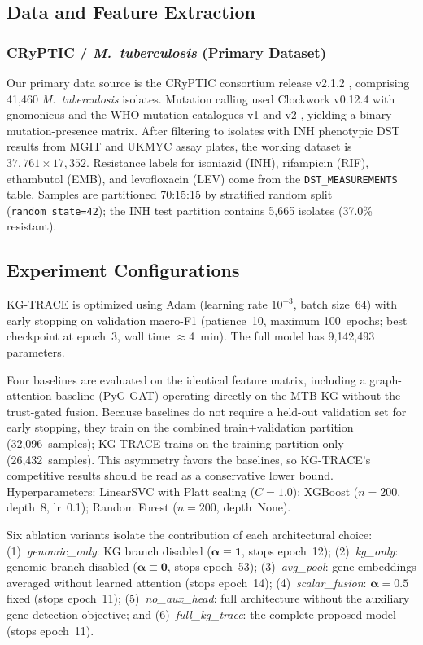 \documentclass[conference]{IEEEtran}
\begin{document}
\subsection{Data and Feature Extraction}

\subsubsection{CRyPTIC / \textit{M.~tuberculosis} (Primary Dataset)}

Our primary data source is the CRyPTIC consortium release v2.1.2 \cite{cryptic2022}, comprising 41,460 \textit{M.~tuberculosis} isolates. Mutation calling used Clockwork v0.12.4 with gnomonicus and the WHO mutation catalogues v1 and v2 \cite{who_cat_v1,who_cat_v2}, yielding a binary mutation-presence matrix. After filtering to isolates with INH phenotypic DST results from MGIT and UKMYC assay plates, the working dataset is $37{,}761 \times 17{,}352$. Resistance labels for isoniazid (INH), rifampicin (RIF), ethambutol (EMB), and levofloxacin (LEV) come from the \texttt{DST\_MEASUREMENTS} table. Samples are partitioned 70:15:15 by stratified random split (\texttt{random\_state=42}); the INH test partition contains 5,665 isolates (37.0\% resistant).

\subsection{Experiment Configurations}

KG-TRACE is optimized using Adam (learning rate $10^{-3}$, batch size~64) with early stopping on validation macro-F1 (patience~10, maximum 100~epochs; best checkpoint at epoch~3, wall time $\approx$4~min). The full model has 9,142,493 parameters.

Four baselines are evaluated on the identical feature matrix,
including a graph-attention baseline (PyG GAT) operating directly on the MTB KG without the trust-gated fusion. Because baselines do not require a held-out validation set for early stopping, they train on the combined train+validation partition (32,096~samples); KG-TRACE trains on the training partition only (26,432~samples). This asymmetry favors the baselines, so KG-TRACE's competitive results should be read as a conservative lower bound. Hyperparameters: LinearSVC with Platt scaling ($C\!=\!1.0$); XGBoost ($n\!=\!200$, depth~8, lr~0.1); Random Forest ($n\!=\!200$, depth~None).

Six ablation variants isolate the contribution of each architectural choice: (1)~\textit{genomic\_only}: KG branch disabled ($\boldsymbol{\alpha} \equiv \mathbf{1}$, stops epoch~12); (2)~\textit{kg\_only}: genomic branch disabled ($\boldsymbol{\alpha} \equiv \mathbf{0}$, stops epoch~53); (3)~\textit{avg\_pool}: gene embeddings averaged without learned attention (stops epoch~14); (4)~\textit{scalar\_fusion}: $\boldsymbol{\alpha}{=}0.5$ fixed (stops epoch~11); (5)~\textit{no\_aux\_head}: full architecture without the auxiliary gene-detection objective; and (6)~\textit{full\_kg\_trace}: the complete proposed model (stops epoch~11).
\end{document}
